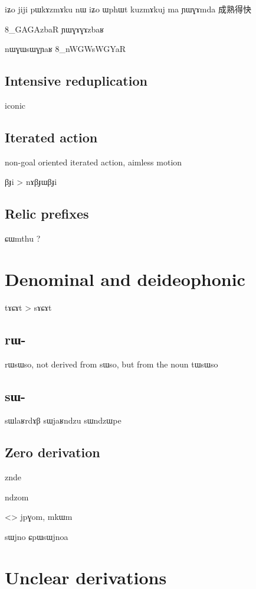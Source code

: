 \documentclass[oldfontcommands,oneside,a4paper,11pt]{memoir}
\begin{document}
iʑo jiji pɯkɤzmɤku nɯ iʑo ɯphɯt kuzmɤkuj ma ɲɯɣɤmda 成熟得快


8_GAGAzbaR
ɲɯɣɤɣɤzbaʁ

nɯɣɯsɯɣɲaʁ
8_nWGWsWGYaR
\subsection{Intensive reduplication} \label{sub:intensive.redp}
iconic

 \subsection{Iterated action}

non-goal oriented iterated action, aimless motion

βɟi > nɤβɟɯβɟi

\subsection{Relic prefixes}

ɕɯmthu ?

\section{Denominal and deideophonic} \label{sec:denominal}


tɤɕɤt > sɤɕɤt

\subsection{rɯ-}
rɯsɯso, not derived from sɯso, but from the noun tɯsɯso
\subsection{sɯ-}
sɯlaʁrdɤβ
sɯjaʁndzu
sɯndzɯpe

\subsection{Zero derivation} \label{sub:zero.derivation}


znde

ndzom

<> jpɣom, mkɯm

sɯjno
ɕpɯsɯjnoa

 
\section{Unclear derivations}
\end{document}
